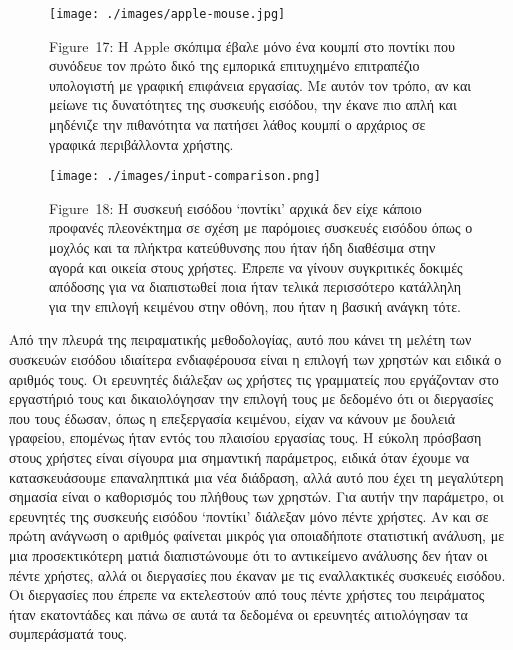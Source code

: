 \documentclass[
]{article}
\begin{document}
\leavevmode{}%
\begin{figure}
\hypertarget{fig:apple-mouse}{%
\centering
\texttt{[image: ./images/apple-mouse.jpg]}
\caption{Figure~17: Η Apple σκόπιμα έβαλε μόνο ένα κουμπί στο ποντίκι
που συνόδευε τον πρώτο δικό της εμπορικά επιτυχημένο επιτραπέζιο
υπολογιστή με γραφική επιφάνεια εργασίας. Με αυτόν τον τρόπο, αν και
μείωνε τις δυνατότητες της συσκευής εισόδου, την έκανε πιο απλή και
μηδένιζε την πιθανότητα να πατήσει λάθος κουμπί ο αρχάριος σε γραφικά
περιβάλλοντα χρήστης.}\label{fig:apple-mouse}
}
\end{figure}

\leavevmode{}%
\begin{figure}
\hypertarget{fig:input-comparison}{%
\centering
\texttt{[image: ./images/input-comparison.png]}
\caption{Figure~18: Η συσκευή εισόδου `ποντίκι' αρχικά δεν είχε κάποιο
προφανές πλεονέκτημα σε σχέση με παρόμοιες συσκευές εισόδου όπως ο
μοχλός και τα πλήκτρα κατεύθυνσης που ήταν ήδη διαθέσιμα στην αγορά και
οικεία στους χρήστες. Έπρεπε να γίνουν συγκριτικές δοκιμές απόδοσης για
να διαπιστωθεί ποια ήταν τελικά περισσότερο κατάλληλη για την επιλογή
κειμένου στην οθόνη, που ήταν η βασική ανάγκη
τότε.}\label{fig:input-comparison}
}
\end{figure}

Από την πλευρά της πειραματικής μεθοδολογίας, αυτό που κάνει τη μελέτη
των συσκευών εισόδου ιδιαίτερα ενδιαφέρουσα είναι η επιλογή των χρηστών
και ειδικά ο αριθμός τους. Οι ερευνητές διάλεξαν ως χρήστες τις
γραμματείς που εργάζονταν στο εργαστήριό τους και δικαιολόγησαν την
επιλογή τους με δεδομένο ότι οι διεργασίες που τους έδωσαν, όπως η
επεξεργασία κειμένου, είχαν να κάνουν με δουλειά γραφείου, επομένως ήταν
εντός του πλαισίου εργασίας τους. Η εύκολη πρόσβαση στους χρήστες είναι
σίγουρα μια σημαντική παράμετρος, ειδικά όταν έχουμε να κατασκευάσουμε
επαναληπτικά μια νέα διάδραση, αλλά αυτό που έχει τη μεγαλύτερη σημασία
είναι ο καθορισμός του πλήθους των χρηστών. Για αυτήν την παράμετρο, οι
ερευνητές της συσκευής εισόδου `ποντίκι' διάλεξαν μόνο πέντε χρήστες. Αν
και σε πρώτη ανάγνωση ο αριθμός φαίνεται μικρός για οποιαδήποτε
στατιστική ανάλυση, με μια προσεκτικότερη ματιά διαπιστώνουμε ότι το
αντικείμενο ανάλυσης δεν ήταν οι πέντε χρήστες, αλλά οι διεργασίες που
έκαναν με τις εναλλακτικές συσκευές εισόδου. Οι διεργασίες που έπρεπε να
εκτελεστούν από τους πέντε χρήστες του πειράματος ήταν εκατοντάδες και
πάνω σε αυτά τα δεδομένα οι ερευνητές αιτιολόγησαν τα συμπεράσματά τους.
\end{document}
